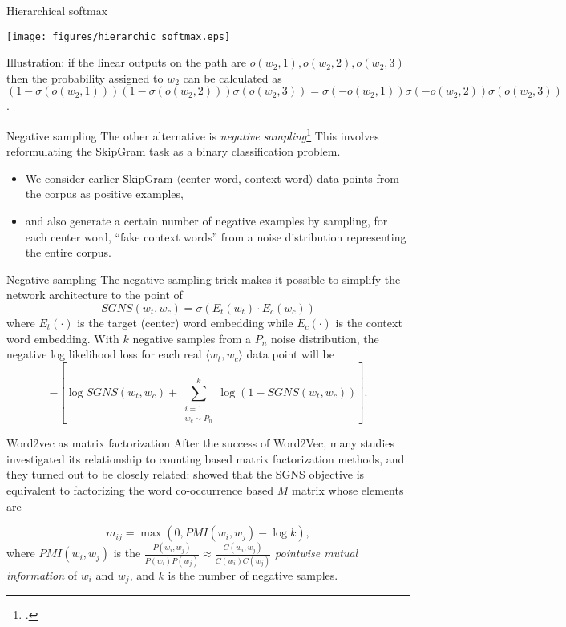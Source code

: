 \documentclass[style=upen, size=14pt]{powerdot}
\newcommand{\gold}{\color{arany}}
\theoremstyle{definition}
\begin{document}
\begin{slide}[toc=]{Hierarchical softmax}
  \begin{center}
    \texttt{[image: figures/hierarchic\_softmax.eps]}
\end{center}
Illustration: if the linear outputs on the path are $o(w_2, 1), o(w_2, 2), o(w_2, 3)$ then the
probability assigned to $w_2$ can be calculated as
$(1-\sigma(o(w_2,1)))(1-\sigma(o(w_2,2)))\sigma(o(w_2,3))=
\sigma(-o(w_2,1))\sigma(-o(w_2,2))\sigma(o(w_2,3))$.
\end{slide}

\begin{slide}[toc=]{Negative sampling}
  The other alternative is \emph{\gold negative
    sampling}\footnote{\citet{mikolov2013distributed}.} This involves
  reformulating the SkipGram task as a binary classification problem.
  \begin{itemize}
  \item We consider earlier SkipGram $\langle$center word, context word$\rangle$
    data points from the corpus as positive examples,
  \item and also generate a certain number of negative examples by sampling, for
    each center word, ``fake context words'' from a noise distribution
    representing the entire corpus.
  \end{itemize}
\end{slide}

\begin{slide}[toc=]{Negative sampling}
  The negative sampling trick makes it possible to simplify the network
  architecture to the point of
  $$
  SGNS(w_{t}, w_{c}) = \sigma(E_t(w_t)\cdot E_c(w_c)) 
  $$
  where $E_t(\cdot)$ is the target (center) word embedding while $E_c(\cdot)$ is
  the context word embedding. With $k$ negative samples from a $P_n$ noise
  distribution, the negative log likelihood loss for each real
  $\langle w_t, w_c\rangle$ data point will be
  $$
  - [ \log SGNS(w_{t}, w_{c}) + \sum_{\substack{i=1 \\ {w}_c \sim P_n}}^k
  \log(1 - SGNS(w_{t}, {{w}_c}))].  $$
\end{slide}

\begin{slide}[toc=W2V as factorization]{Word2vec as matrix factorization}
  After the success of Word2Vec, many studies investigated its relationship to
  counting based matrix factorization methods, and they turned out to be closely
  related: \cite{levy2014neural} showed that the SGNS objective is equivalent to
  factorizing the word co-occurrence based $M$ matrix whose elements are

  $$
  m_{ij} = \max(0, PMI(w_i, w_j )- \log k),
  $$
  where $PMI(w_i,w_j)$ is the
  $\frac{P(w_i, w_j)}{P(w_i)P(w_j)}\approx \frac{C(w_i, w_j)}{C(w_i)C(w_j)}$
  \emph{pointwise mutual information} of $w_i$ and $w_j$, and $k$ is the number
  of negative samples.
\end{slide}
\end{document}
